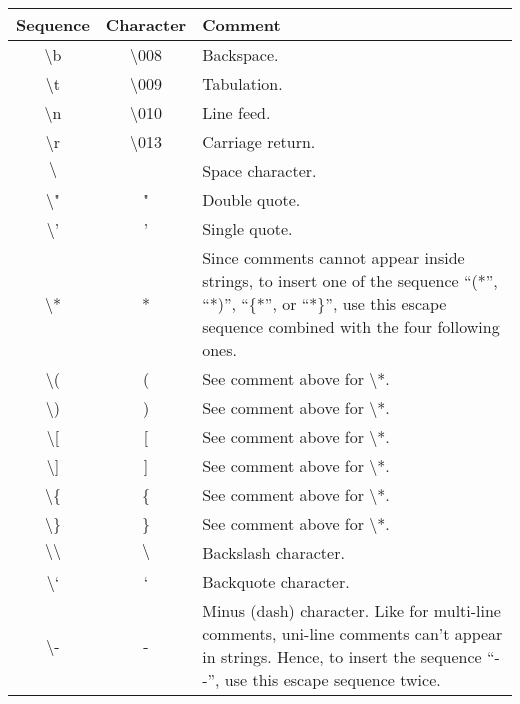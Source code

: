 \medskip
\noindent
\begin{tabular}{|c|c|p{7cm}|}
  \hline
  Sequence & Character & Comment \\
  \hline
  $\setminus$b & $\setminus$008 & Backspace. \\
  \hline
  $\setminus$t & $\setminus$009 & Tabulation. \\
  \hline
  $\setminus$n & $\setminus$010 & Line feed. \\
  \hline
  $\setminus$r & $\setminus$013 & Carriage return. \\
  \hline
  $\setminus$\textvisiblespace  & \textvisiblespace      & Space character. \\
  \hline
  $\setminus$" & "              & Double quote. \\
  \hline
  $\setminus$' & '              & Single quote. \\
  \hline
  $\setminus$* & *              & Since comments cannot appear inside
                                  strings, to insert one of the
                                  sequence ``(*'', ``*)'', ``\{*'', or
                                  ``*\}'', use this escape sequence
                                  combined with the four following
                                  ones. \\
  \hline
  $\setminus$( & (              & See comment above for $\setminus$*. \\
  \hline
  $\setminus$) & )              & See comment above for $\setminus$*. \\
  \hline
  $\setminus$[ & [              & See comment above for $\setminus$*. \\
  \hline
  $\setminus$] & ]              & See comment above for $\setminus$*. \\
  \hline
  $\setminus$\{ & \{            & See comment above for $\setminus$*. \\
  \hline
  $\setminus$\} & \}            & See comment above for $\setminus$*. \\
  \hline
  $\setminus\setminus$ & $\setminus$      & Backslash character. \\
  \hline
  $\setminus$` & `              & Backquote character. \\
  \hline
  $\setminus$\-- & \--          & Minus (dash) character. Like for multi-line
                                  comments, uni-line comments can't appear in
                                  strings. Hence, to insert the sequence
                                  ``\--\--'', use this escape sequence twice. \\

\end{tabular}
